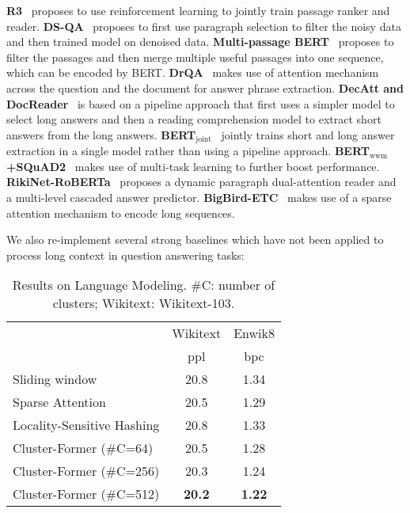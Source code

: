 \textbf{R3}~\citep{wang2018r} proposes to use reinforcement learning to jointly train passage ranker and reader.
\textbf{DS-QA}~\citep{lin2018denoising} proposes to first use paragraph selection to filter the noisy data and then trained model on denoised data.
\textbf{Multi-passage BERT}~\citep{wang2019multi} proposes to filter the passages and then merge multiple useful passages into one sequence, which can be encoded by BERT.
\textbf{DrQA}~\citep{chen2017reading} makes use of attention mechanism across the question and the document for answer phrase extraction.
\textbf{DecAtt and DocReader}~\citep{kwiatkowski2019natural} is based on a pipeline approach that first uses a simpler model to select long answers and then a reading comprehension model to extract short answers from the long answers.
\textbf{BERT$_\text{joint}$}~\citep{alberti2019bert} jointly trains short and long answer extraction in a single model rather than using a pipeline approach.
\textbf{BERT$_\text{wwm}$+SQuAD2}~\citep{pan2019frustratingly} makes use of multi-task learning to further boost performance.
\textbf{RikiNet-RoBERTa}~\citep{liu2020rikinet} proposes a dynamic paragraph dual-attention reader and a multi-level
cascaded answer predictor.
\textbf{BigBird-ETC}~\citep{zaheer2020big} makes use of a sparse attention mechanism to encode long sequences.

We also re-implement several strong baselines which have not been applied to process long context in question answering tasks:


\begin{table}
\centering
\setlength{\tabcolsep}{4.3pt}
\begin{tabular}{lcc}
\toprule
                           & Wikitext & Enwik8\\
                           & ppl         & bpc    \\
\midrule

Sliding window       & 20.8        & 1.34   \\
Sparse Attention    & 20.5        & 1.29   \\
Locality-Sensitive Hashing   & 20.8        & 1.33   \\
\midrule
Cluster-Former (\#C=64)    & 20.5        & 1.28   \\
Cluster-Former (\#C=256)   & 20.3        & 1.24   \\
Cluster-Former (\#C=512)   & \textbf{20.2}        & \textbf{1.22}  \\
\bottomrule
\end{tabular}
\caption{Results on Language Modeling.  \#C: number of clusters;  Wikitext: Wikitext-103.}
\label{tbl:lm}
\end{table}

